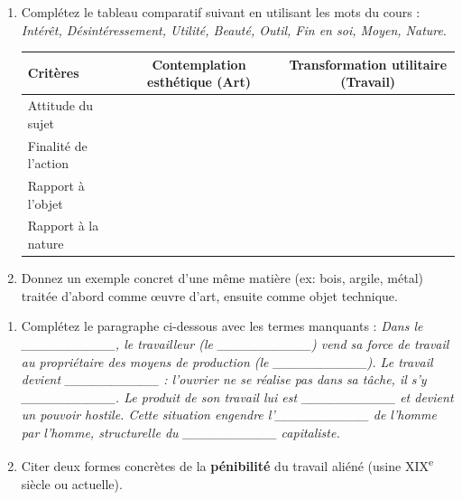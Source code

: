 \documentclass[11pt]{article}
\begin{document}
\begin{exercice}
\begin{enumerate}
    \item Complétez le tableau comparatif suivant en utilisant les mots du cours : \textit{Intérêt, Désintéressement, Utilité, Beauté, Outil, Fin en soi, Moyen, Nature}.
    \begin{center}
    \begin{tabular}{|l|c|c|}
    \hline
    \textbf{Critères} & \textbf{Contemplation esthétique (Art)} & \textbf{Transformation utilitaire (Travail)} \\
    \hline
    Attitude du sujet &  &  \\
    \hline
    Finalité de l'action &  &  \\
    \hline
    Rapport à l'objet &  &  \\
    \hline
    Rapport à la nature &  &  \\
    \hline
    \end{tabular}
    \end{center}
    \item Donnez un exemple concret d'une même matière (ex: bois, argile, métal) traitée d'abord comme œuvre d'art, ensuite comme objet technique.
\end{enumerate}
\end{exercice}

\begin{exercice}
\begin{enumerate}
    \item Complétez le paragraphe ci-dessous avec les termes manquants :
    \textit{Dans le \_\_\_\_\_\_\_\_\_\_, le travailleur (le \_\_\_\_\_\_\_\_\_\_) vend sa force de travail au propriétaire des moyens de production (le \_\_\_\_\_\_\_\_\_\_). Le travail devient \_\_\_\_\_\_\_\_\_\_ : l'ouvrier ne se réalise pas dans sa tâche, il s'y \_\_\_\_\_\_\_\_\_\_. Le produit de son travail lui est \_\_\_\_\_\_\_\_\_\_ et devient un pouvoir hostile. Cette situation engendre l'\_\_\_\_\_\_\_\_\_\_ de l'homme par l'homme, structurelle du \_\_\_\_\_\_\_\_\_\_ capitaliste.}
    \item Citer deux formes concrètes de la \textbf{pénibilité} du travail aliéné (usine XIX\textsuperscript{e} siècle ou actuelle).
\end{enumerate}
\end{exercice}
\end{document}

